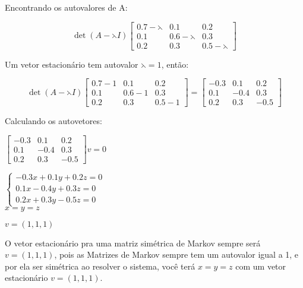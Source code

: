 \documentclass[leqno]{article}
\numberwithin{equation}{section}
\begin{document}
\begin{enumerate}
\begin{sol}
		
		Encontrando os autovalores de A:
		
		$$\det(A - \leftthreetimes I) \begin{bmatrix}
			0.7 - \leftthreetimes & 0.1 & 0.2 \\
			0.1 & 0.6 - \leftthreetimes & 0.3 \\
			0.2 & 0.3 & 0.5 - \leftthreetimes
		\end{bmatrix}$$
	
		Um vetor estacionário tem autovalor $\leftthreetimes = 1$, então:
		
		$$\det(A - \leftthreetimes I) \begin{bmatrix}
			0.7 - 1 & 0.1 & 0.2 \\
			0.1 & 0.6 - 1 & 0.3 \\
			0.2 & 0.3 & 0.5 - 1
		\end{bmatrix} = \begin{bmatrix}
			-0.3 & 0.1 & 0.2 \\
			0.1 & -0.4 & 0.3 \\
			0.2 & 0.3 & -0.5
		\end{bmatrix}$$
	
		Calculando os autovetores:
		
		$\begin{bmatrix}
			-0.3 & 0.1 & 0.2 \\
			0.1 & -0.4 & 0.3 \\
			0.2 & 0.3 & -0.5
		\end{bmatrix}v = 0$
	
		$
		\left\{
		\begin {array}{l}
		-0.3x +0.1y + 0.2z = 0\\
		0.1x -0.4y + 0.3z = 0\\
		0.2x + 0.3y - 0.5z = 0
		\end{array}
		\right.$\\
		
		$x = y = z$
		
		$v = (1, 1, 1)$
		
		
		O vetor estacionário pra uma matriz simétrica de Markov sempre será $v = (1, 1, 1)$, pois as Matrizes de Markov sempre tem um autovalor igual a 1, e por ela ser simétrica ao resolver o sistema, você terá $x = y = z$ com um vetor estacionário $v = (1, 1, 1)$.
		
		\end{sol} 
		
		

\end{enumerate}
\end{document}
